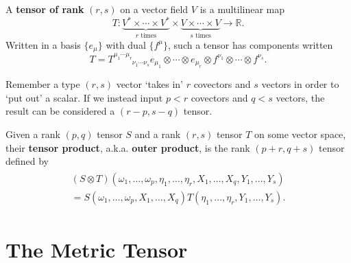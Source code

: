 \documentclass[12pt]{article}
\begin{document}
\begin{definition}[Tensor]
	A \textbf{tensor of rank} $(r,s)$ on a vector field $V$ is a multilinear map
		\begin{equation}
			T: \underbrace{V^* \times \cdots \times V^*}_{r \text{ times}} \times \underbrace{V \times \cdots \times V}_{s \text{ times}} \to \mathbb{R}.
		\end{equation}
	Written in a basis $\{e_\mu\}$ with dual $\{ f^\mu \}$, such a tensor has components written
		\begin{equation}
			T = T^{\mu_1 \cdots \mu_r}_{\phantom{\mu_1 \cdots \mu_r} \nu_1 \cdots \nu_s} e_{\mu_1} \otimes \cdots \otimes e_{\mu_r} \otimes f^{\nu_1} \otimes \cdots \otimes f^{\nu_s}.
		\end{equation}
\end{definition}
\begin{remark}
	Remember a type $(r,s)$ vector `takes in' $r$ covectors and $s$ vectors in order to `put out' a scalar. If we instead input $p < r$ covectors and $q < s$ vectors, the result can be considered a $(r-p,s-q)$ tensor.
\end{remark}

\begin{definition}
	Given a rank $(p,q)$ tensor $S$ and a rank $(r,s)$ tensor $T$ on some vector space, their \textbf{tensor product}, a.k.a. \textbf{outer product}, is the rank $(p+r,q+s)$ tensor defined by
		\begin{align} \begin{split}
			(S \otimes T)(\omega_1, \ldots, \omega_p, \eta_1, \ldots, \eta_r, X_1, \ldots, X_q, Y_1, \ldots, Y_s) \\
			= S(\omega_1, \ldots, \omega_p, X_1, \ldots, X_q) T(\eta_1, \ldots, \eta_r, Y_1, \ldots, Y_s).
		\end{split} \end{align}
\end{definition}

\section{The Metric Tensor}
\end{document}
